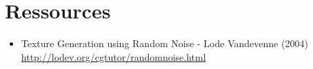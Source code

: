 \section{Ressources}
\label{s:ressources}

\begin{itemize}
\item Texture Generation using Random Noise - Lode Vandevenne (2004) \\ \url{http://lodev.org/cgtutor/randomnoise.html}\label{src-procedural-texture}
\end{itemize}